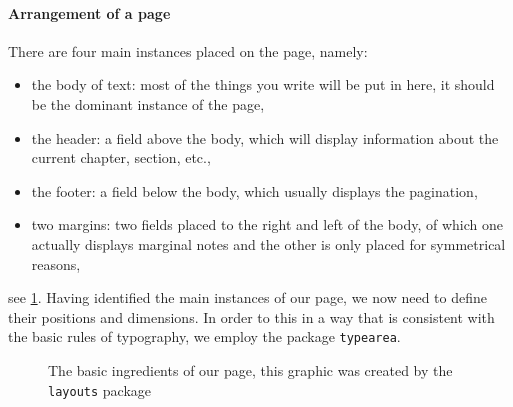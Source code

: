 \paragraph{Arrangement of a page} There are four main instances placed on the page, namely:
\begin{itemize}
\item the body of text: most of the things you write will be put in here, it should 
be the dominant instance of the page,
\item the header: a field above the body, which will display information about the 
current chapter, section, etc.,
\item the footer: a field below the body, which usually displays the pagination,
\item two margins: two fields placed to the right and left of the body, of which one 
actually displays marginal notes and the other is only placed for symmetrical reasons,
\end{itemize}
see \cref{fig:play}. Having identified the main instances of our page, we now need to 
define their positions and dimensions. In order to this in a way that is consistent with 
the basic rules of typography, we employ the package \texttt{typearea}.
\begin{figure}
\currentpage
\printheadingsfalse
\printparametersfalse
\marginparswitchtrue
\pagedesign
\caption{The basic ingredients of our page, this graphic was created by the 
\texttt{layouts} package} \label{fig:play}
\end{figure}






